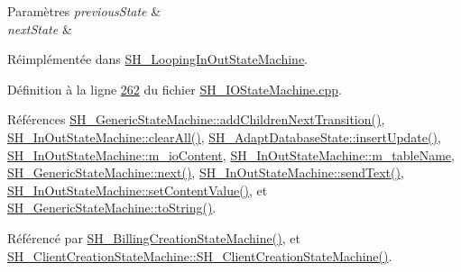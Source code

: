 \begin{DoxyParams}{Paramètres}
{\em previous\-State} & \\
\hline
{\em next\-State} & \\
\hline
\end{DoxyParams}


Réimplémentée dans \hyperlink{classSH__LoopingInOutStateMachine_abfae9f47019379f270496de46845c729}{S\-H\-\_\-\-Looping\-In\-Out\-State\-Machine}.



Définition à la ligne \hyperlink{SH__IOStateMachine_8cpp_source_l00262}{262} du fichier \hyperlink{SH__IOStateMachine_8cpp_source}{S\-H\-\_\-\-I\-O\-State\-Machine.\-cpp}.



Références \hyperlink{classSH__GenericStateMachine_a16d844020bc26480bd81d6b794c8364c}{S\-H\-\_\-\-Generic\-State\-Machine\-::add\-Children\-Next\-Transition()}, \hyperlink{classSH__InOutStateMachine_aa1d5860888c96ff94c55dc77e0fdfdcf}{S\-H\-\_\-\-In\-Out\-State\-Machine\-::clear\-All()}, \hyperlink{classSH__AdaptDatabaseState_a037db544ea05f42d21fcbdda758839fe}{S\-H\-\_\-\-Adapt\-Database\-State\-::insert\-Update()}, \hyperlink{classSH__InOutStateMachine_a8cfbc27eef057bf37b7711bdfef2077e}{S\-H\-\_\-\-In\-Out\-State\-Machine\-::m\-\_\-io\-Content}, \hyperlink{classSH__InOutStateMachine_aa009eecc5ab6181358faafb5996b6006}{S\-H\-\_\-\-In\-Out\-State\-Machine\-::m\-\_\-table\-Name}, \hyperlink{classSH__GenericStateMachine_af4771d31d87951c997fba1633c2d67f6}{S\-H\-\_\-\-Generic\-State\-Machine\-::next()}, \hyperlink{classSH__InOutStateMachine_a5e7f5958bae31696b6a8deab94ad2b4f}{S\-H\-\_\-\-In\-Out\-State\-Machine\-::send\-Text()}, \hyperlink{classSH__InOutStateMachine_a9ab1534306b2bdb62743d4bcefe40c17}{S\-H\-\_\-\-In\-Out\-State\-Machine\-::set\-Content\-Value()}, et \hyperlink{classSH__GenericStateMachine_a85c0c1c9d258ae991f84667412fa47cd}{S\-H\-\_\-\-Generic\-State\-Machine\-::to\-String()}.



Référencé par \hyperlink{classSH__BillingCreationStateMachine_ad62b77fa4aeafe200056ff3974562f83}{S\-H\-\_\-\-Billing\-Creation\-State\-Machine()}, et \hyperlink{classSH__ClientCreationStateMachine_a0b406b0f404c0fd33bf35be8ce0cc811}{S\-H\-\_\-\-Client\-Creation\-State\-Machine\-::\-S\-H\-\_\-\-Client\-Creation\-State\-Machine()}.


